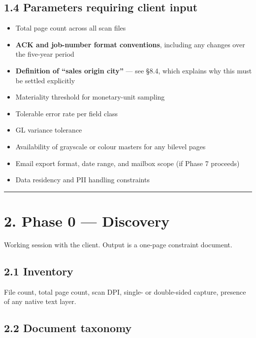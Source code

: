 \documentclass[
]{article}
\providecommand{\tightlist}{%
  \setlength{\itemsep}{0pt}\setlength{\parskip}{0pt}}
\begin{document}
\subsection{1.4 Parameters requiring client
input}\label{parameters-requiring-client-input}

\begin{itemize}
\tightlist
\item
  Total page count across all scan files
\item
  \textbf{ACK and job-number format conventions}, including any changes
  over the five-year period
\item
  \textbf{Definition of ``sales origin city''} --- see §8.4, which
  explains why this must be settled explicitly
\item
  Materiality threshold for monetary-unit sampling
\item
  Tolerable error rate per field class
\item
  GL variance tolerance
\item
  Availability of grayscale or colour masters for any bilevel pages
\item
  Email export format, date range, and mailbox scope (if Phase 7
  proceeds)
\item
  Data residency and PII handling constraints
\end{itemize}

\begin{center}\rule{0.5\linewidth}{0.5pt}\end{center}

\section{2. Phase 0 --- Discovery}\label{phase-0-discovery}

Working session with the client. Output is a one-page constraint
document.

\subsection{2.1 Inventory}\label{inventory}

File count, total page count, scan DPI, single- or double-sided capture,
presence of any native text layer.

\subsection{2.2 Document taxonomy}\label{document-taxonomy}
\end{document}
